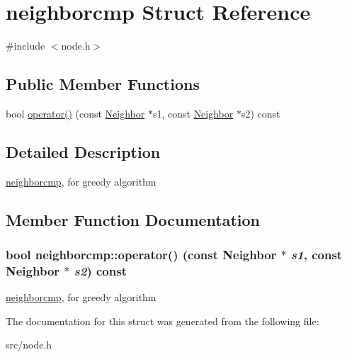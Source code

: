 \hypertarget{structneighborcmp}{
\section{neighborcmp Struct Reference}
\label{structneighborcmp}
}


{\ttfamily \#include $<$node.h$>$}\subsection*{Public Member Functions}
\begin{DoxyCompactItemize}
\item 
bool \hyperlink{structneighborcmp_a9163b5610ba0f4e37061d88ecaeb2f6a}{operator()} (const \hyperlink{classNeighbor}{Neighbor} $\ast$s1, const \hyperlink{classNeighbor}{Neighbor} $\ast$s2) const 
\end{DoxyCompactItemize}


\subsection{Detailed Description}
\hyperlink{structneighborcmp}{neighborcmp}, for greedy algorithm 

\subsection{Member Function Documentation}
\hypertarget{structneighborcmp_a9163b5610ba0f4e37061d88ecaeb2f6a}{
\subsubsection[{operator()}]{\setlength{\rightskip}{0pt plus 5cm}bool neighborcmp::operator() (const {\bf Neighbor} $\ast$ {\em s1}, \/  const {\bf Neighbor} $\ast$ {\em s2}) const}}
\label{structneighborcmp_a9163b5610ba0f4e37061d88ecaeb2f6a}
\hyperlink{structneighborcmp}{neighborcmp}, for greedy algorithm 

The documentation for this struct was generated from the following file:\begin{DoxyCompactItemize}
\item 
src/node.h\end{DoxyCompactItemize}

